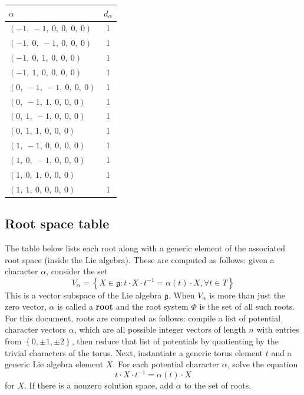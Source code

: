 \documentclass[11pt]{article}
\newcommand{\noi}{\noindent}
\newcommand{\tbf}{\textbf}
\newcommand{\inv}{^{-1}}
\newcommand{\lb}{\left\{}
\newcommand{\rb}{\right\}}
\newcommand{\frakg}{\mathfrak{g}}
\theoremstyle{definition}
\begin{document}
\noindent \begin{tabular}{|l|c|}
    \hline
    \textbf{$\alpha$} & \textbf{$d_{\alpha}$} \\
    \hline
    $\left( -1, \  -1, \  0, \  0, \  0, \  0\right)$ & 1 \\
    \hline
    $\left( -1, \  0, \  -1, \  0, \  0, \  0\right)$ & 1 \\
    \hline
    $\left( -1, \  0, \  1, \  0, \  0, \  0\right)$ & 1 \\
    \hline
    $\left( -1, \  1, \  0, \  0, \  0, \  0\right)$ & 1 \\
    \hline
    $\left( 0, \  -1, \  -1, \  0, \  0, \  0\right)$ & 1 \\
    \hline
    $\left( 0, \  -1, \  1, \  0, \  0, \  0\right)$ & 1 \\
    \hline
    $\left( 0, \  1, \  -1, \  0, \  0, \  0\right)$ & 1 \\
    \hline
    $\left( 0, \  1, \  1, \  0, \  0, \  0\right)$ & 1 \\
    \hline
    $\left( 1, \  -1, \  0, \  0, \  0, \  0\right)$ & 1 \\
    \hline
    $\left( 1, \  0, \  -1, \  0, \  0, \  0\right)$ & 1 \\
    \hline
    $\left( 1, \  0, \  1, \  0, \  0, \  0\right)$ & 1 \\
    \hline
    $\left( 1, \  1, \  0, \  0, \  0, \  0\right)$ & 1 \\
    \hline
\end{tabular}


\subsection{Root space table}

\noi The table below lists each root along with a generic element of the associated root space (inside the Lie algebra). These are computed as follows: given a character $\alpha$, consider the set
\[
	V_\alpha = \lb X \in \frakg : t \cdot X \cdot t \inv = \alpha(t) \cdot X, \forall t \in T \rb
\]
This is a vector subspace of the Lie algebra $\frakg$. When $V_\alpha$ is more than just the zero vector, $\alpha$ is called a \tbf{root} and the root system $\Phi$ is the set of all such roots. For this document, roots are computed as follows: compile a list of potential character vectors $\alpha$, which are all possible integer vectors of length $n$ with entries from $\lb 0, \pm 1, \pm 2 \rb$, then reduce that list of potentials by quotienting by the trivial characters of the torus. Next, instantiate a generic torus element $t$ and a generic Lie algebra element $X$. For each potential character $\alpha$, solve the equation
\[
	t \cdot X \cdot t \inv = \alpha(t) \cdot X
\]
for $X$. If there is a nonzero solution space, add $\alpha$ to the set of roots.
\end{document}
